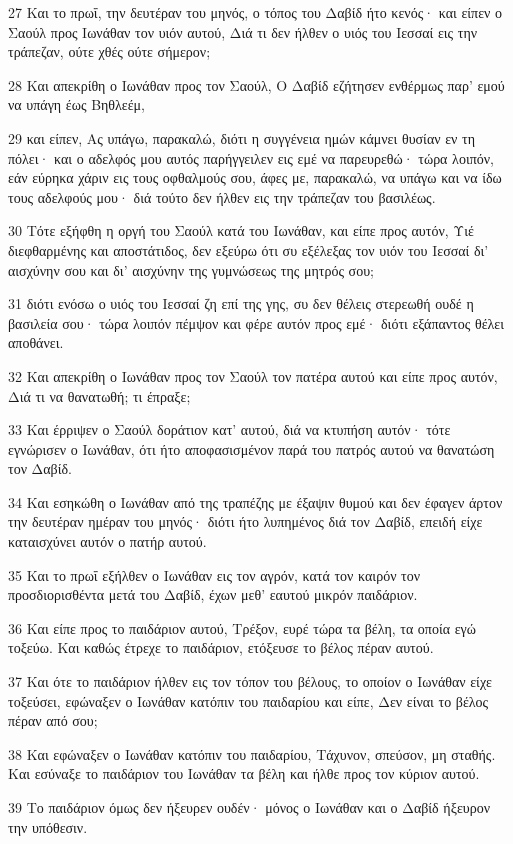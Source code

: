 \par 27 Και το πρωΐ, την δευτέραν του μηνός, ο τόπος του Δαβίδ ήτο κενός· και είπεν ο Σαούλ προς Ιωνάθαν τον υιόν αυτού, Διά τι δεν ήλθεν ο υιός του Ιεσσαί εις την τράπεζαν, ούτε χθές ούτε σήμερον;
\par 28 Και απεκρίθη ο Ιωνάθαν προς τον Σαούλ, Ο Δαβίδ εζήτησεν ενθέρμως παρ' εμού να υπάγη έως Βηθλεέμ,
\par 29 και είπεν, Ας υπάγω, παρακαλώ, διότι η συγγένεια ημών κάμνει θυσίαν εν τη πόλει· και ο αδελφός μου αυτός παρήγγειλεν εις εμέ να παρευρεθώ· τώρα λοιπόν, εάν εύρηκα χάριν εις τους οφθαλμούς σου, άφες με, παρακαλώ, να υπάγω και να ίδω τους αδελφούς μου· διά τούτο δεν ήλθεν εις την τράπεζαν του βασιλέως.
\par 30 Τότε εξήφθη η οργή του Σαούλ κατά του Ιωνάθαν, και είπε προς αυτόν, Υιέ διεφθαρμένης και αποστάτιδος, δεν εξεύρω ότι συ εξέλεξας τον υιόν του Ιεσσαί δι' αισχύνην σου και δι' αισχύνην της γυμνώσεως της μητρός σου;
\par 31 διότι ενόσω ο υιός του Ιεσσαί ζη επί της γης, συ δεν θέλεις στερεωθή ουδέ η βασιλεία σου· τώρα λοιπόν πέμψον και φέρε αυτόν προς εμέ· διότι εξάπαντος θέλει αποθάνει.
\par 32 Και απεκρίθη ο Ιωνάθαν προς τον Σαούλ τον πατέρα αυτού και είπε προς αυτόν, Διά τι να θανατωθή; τι έπραξε;
\par 33 Και έρριψεν ο Σαούλ δοράτιον κατ' αυτού, διά να κτυπήση αυτόν· τότε εγνώρισεν ο Ιωνάθαν, ότι ήτο αποφασισμένον παρά του πατρός αυτού να θανατώση τον Δαβίδ.
\par 34 Και εσηκώθη ο Ιωνάθαν από της τραπέζης με έξαψιν θυμού και δεν έφαγεν άρτον την δευτέραν ημέραν του μηνός· διότι ήτο λυπημένος διά τον Δαβίδ, επειδή είχε καταισχύνει αυτόν ο πατήρ αυτού.
\par 35 Και το πρωΐ εξήλθεν ο Ιωνάθαν εις τον αγρόν, κατά τον καιρόν τον προσδιορισθέντα μετά του Δαβίδ, έχων μεθ' εαυτού μικρόν παιδάριον.
\par 36 Και είπε προς το παιδάριον αυτού, Τρέξον, ευρέ τώρα τα βέλη, τα οποία εγώ τοξεύω. Και καθώς έτρεχε το παιδάριον, ετόξευσε το βέλος πέραν αυτού.
\par 37 Και ότε το παιδάριον ήλθεν εις τον τόπον του βέλους, το οποίον ο Ιωνάθαν είχε τοξεύσει, εφώναξεν ο Ιωνάθαν κατόπιν του παιδαρίου και είπε, Δεν είναι το βέλος πέραν από σου;
\par 38 Και εφώναξεν ο Ιωνάθαν κατόπιν του παιδαρίου, Τάχυνον, σπεύσον, μη σταθής. Και εσύναξε το παιδάριον του Ιωνάθαν τα βέλη και ήλθε προς τον κύριον αυτού.
\par 39 Το παιδάριον όμως δεν ήξευρεν ουδέν· μόνος ο Ιωνάθαν και ο Δαβίδ ήξευρον την υπόθεσιν.
